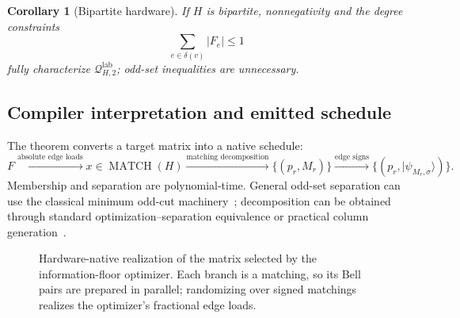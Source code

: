 \documentclass[11pt]{article}
\newtheorem{corollary}[corollary]{Corollary}
\theoremstyle{definition}
\theoremstyle{remark}
\newcommand{\Q}{\mathcal{Q}}
\newcommand{\MATCH}{\operatorname{MATCH}}
\newcommand{\sgn}{\operatorname{sgn}}
\newcommand{\off}{\operatorname{off}}
\newcommand{\lab}{\mathrm{lab}}
\newcommand{\ket}[1]{\lvert #1\rangle}
\begin{document}
\begin{corollary}[Bipartite hardware]
\label{cor:bipartite-hardware}
If $H$ is bipartite, nonnegativity and the degree constraints
\begin{equation}
  \sum_{e\in\delta(v)}|F_e|\le1
\end{equation}
fully characterize $\Q^{\lab}_{H,2}$; odd-set inequalities are unnecessary.
\end{corollary}

\subsection{Compiler interpretation and emitted schedule}
The theorem converts a target matrix into a native schedule:
\begin{equation}
  F
  \xrightarrow{\text{absolute edge loads}}
  x\in\MATCH(H)
  \xrightarrow{\text{matching decomposition}}
  \{(p_r,M_r)\}
  \xrightarrow{\text{edge signs}}
  \{(p_r,\ket{\psi_{M_r,\sigma}})\}.
  \label{eq:constructive-chain}
\end{equation}
Membership and separation are polynomial-time. General odd-set separation can use the classical minimum odd-cut machinery~\cite{PadbergRao1982}; decomposition can be obtained through standard optimization--separation equivalence or practical column generation~\cite{GrotschelLovaszSchrijver1988}.

\begin{figure}[H]
\centering
{}
\caption{Hardware-native realization of the matrix selected by the information-floor optimizer. Each branch is a matching, so its Bell pairs are prepared in parallel; randomizing over signed matchings realizes the optimizer's fractional edge loads.}
\label{fig:matching-schedule}
\end{figure}
\end{document}
